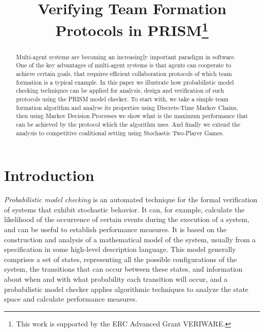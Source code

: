 \documentclass{llncs}
\newcommand{\comment}[1]{{\color{red}{[\sf #1]}}}
\begin{document}
\title{Verifying Team Formation Protocols in PRISM\thanks{This work is supported by
the ERC Advanced Grant VERIWARE.}}
\author{}
\email{}

\maketitle

\begin{abstract}

Multi-agent systems are becoming an increasingly important paradigm in software. One of the key advantages of multi-agent systems is that agents can cooperate to achieve certain goals, that requires efficient collaboration protocols of which team formation is a typical example. In this paper we illustrate how probabilistic model checking techniques can be applied for analysis, design and verification of such protocols using the PRISM model checker. To start with, we take a simple team formation algorithm and analyse its properties using Discrete-Time Markov Chains, then using Markov Decision Processes we show what is the maximum performance that can be achieved by the protocol which the algorithm uses. And finally we extend the analysis to competitive coalitional setting using Stochastic Two-Player Games.


\end{abstract}

\section{Introduction}

\comment{will need a high-level description of PMC in intro, so put this here}

\emph{Probabilistic model checking} is an automated technique for
the formal verification of systems that exhibit stochastic behavior. It can, for example,
calculate the likelihood of the occurrence of certain events
during the execution of a system, and can be useful to establish performance
measures. It is based on the construction and analysis of a
mathematical model of the system, usually from a specification
in some high-level description language. This model
generally comprises a set of states, representing all the possible
configurations of the system, the transitions that can
occur between these states, and information about when and
with what probability each transition will occur, and a probabilistic model checker applies algorithmic techniques to analyze the state space and calculate performance measures.
\end{document}
